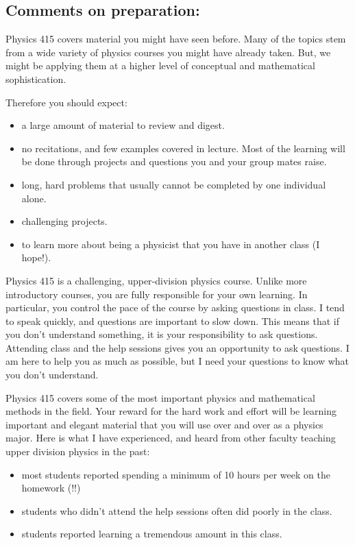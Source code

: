 \documentclass[letterpaper,10pt,english]{jupyterBook}
\begin{document}
\subsection{Comments on preparation:}
\label{\detokenize{content/0_course/environment:comments-on-preparation}}
\sphinxAtStartPar
Physics 415 covers material you might have seen before. Many of the topics
stem from a wide variety of physics courses you might have already taken. But, we might be applying them at a higher level of conceptual and mathematical sophistication.

\sphinxAtStartPar
Therefore you should expect:
\begin{itemize}
\item {} 
\sphinxAtStartPar
a large amount of material to review and digest.

\item {} 
\sphinxAtStartPar
no recitations, and few examples covered in lecture. Most of the learning will be done through projects and questions you and your group mates raise.

\item {} 
\sphinxAtStartPar
long, hard problems that usually cannot be completed by one individual alone.

\item {} 
\sphinxAtStartPar
challenging projects.

\item {} 
\sphinxAtStartPar
to learn more about being a physicist that you have in another class (I hope!).

\end{itemize}

\sphinxAtStartPar
Physics 415 is a challenging, upper‐division physics course. Unlike more introductory courses, you are fully responsible for your own learning. In particular, you control the pace of the course by asking questions in class. I tend to speak quickly, and questions are important to slow down. This means that if you don’t understand something, it is your responsibility to ask questions. Attending class and the help sessions gives you an opportunity to ask questions. I am here to help you as much as possible, but I need your questions to know what you don’t understand.

\sphinxAtStartPar
Physics 415 covers some of the most important physics and mathematical methods in the field. Your reward for the hard work and effort will be learning important and elegant material that you will use over and over as a physics major. Here is what I have experienced, and heard from
other faculty teaching upper division physics in the past:
\begin{itemize}
\item {} 
\sphinxAtStartPar
most students reported spending a minimum of 10 hours per week on the
homework (!!)

\item {} 
\sphinxAtStartPar
students who didn’t attend the help sessions
often did poorly in the class.

\item {} 
\sphinxAtStartPar
students reported learning a tremendous amount in this class.

\end{itemize}
\end{document}
